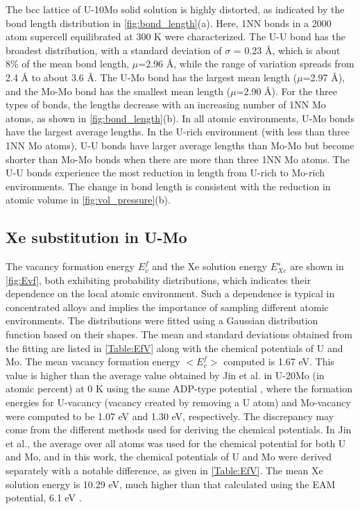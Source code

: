 \documentclass[review]{elsarticle}
\begin{document}
The bcc lattice of U-10Mo solid solution is highly distorted, as indicated by the bond length distribution in \cref{fig:bond_length}(a). Here, 1NN bonds in a 2000 atom supercell equilibrated at 300 K were characterized. The U-U bond has the broadest distribution, with a standard deviation of $\sigma$ = 0.23 {\AA}, which is about 8\% of the mean bond length, $\mu$=2.96 {\AA}, while the range of variation spreads from 2.4 {\AA} to about 3.6 {\AA}. The U-Mo bond has the largest mean length ($\mu$=2.97 {\AA}), and the Mo-Mo bond has the smallest mean length ($\mu$=2.90 {\AA}). For the three types of bonds, the lengths decrease with an increasing number of 1NN Mo atoms, as shown in \cref{fig:bond_length}(b). In all atomic environments, U-Mo bonds have the largest average lengths. In the U-rich environment (with less than three 1NN Mo atoms), U-U bonds have larger average lengths than Mo-Mo but become shorter than Mo-Mo bonds when there are more than three 1NN Mo atoms. The U-U bonds experience the most reduction in length from U-rich to Mo-rich environments. The change in bond length is consistent with the reduction in atomic volume in \cref{fig:vol_pressure}(b). 

\subsection{Xe substitution in U-Mo}

The vacancy formation energy $E^f_v$ and the Xe solution energy $E^s_{Xe}$ are shown in \cref{fig:Evf}, both exhibiting probability distributions, which indicates their dependence on the local atomic environment. Such a dependence is typical in concentrated alloys and implies the importance of sampling different atomic environments. The distributions were fitted using a Gaussian distribution function based on their shapes. The mean and standard deviations obtained from the fitting are listed in \cref{Table:EfV} along with the chemical potentials of U and Mo. The mean vacancy formation energy $<E^f_v>$ computed is 1.67 eV. This value is higher than the average value obtained by Jin et al. in U-20Mo (in atomic percent) at 0 K using the same ADP-type potential \cite{jin2021}, where the formation energies for U-vacancy (vacancy created by removing a U atom) and Mo-vacancy were computed to be 1.07 eV and 1.30 eV, respectively. The discrepancy may come from the different methods used for deriving the chemical potentials. In Jin et al., the average over all atoms was used for the chemical potential for both U and Mo, and in this work, the chemical potentials of U and Mo were derived separately with a notable difference, as given in \cref{Table:EfV}. The mean Xe solution energy is 10.29 eV, much higher than that calculated using the EAM potential, 6.1 eV \cite{Beeler2020}. 
\end{document}

